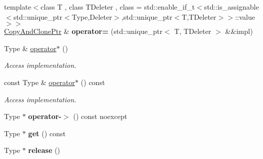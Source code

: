 \begin{DoxyCompactItemize}
\item 
\hypertarget{classSpacy_1_1CopyAndClonePtr_a98faf33ac3e6eb4c2de4b2079499e8cd}{}{\footnotesize template$<$class T , class T\+Deleter , class  = std\+::enable\+\_\+if\+\_\+t$<$std\+::is\+\_\+assignable$<$std\+::unique\+\_\+ptr$<$\+Type,\+Deleter$>$,std\+::unique\+\_\+ptr$<$\+T,\+T\+Deleter$>$$>$\+::value$>$$>$ }\\\hyperlink{classSpacy_1_1CopyAndClonePtr}{Copy\+And\+Clone\+Ptr} \& {\bfseries operator=} (std\+::unique\+\_\+ptr$<$ T, T\+Deleter $>$ \&\&impl)\label{classSpacy_1_1CopyAndClonePtr_a98faf33ac3e6eb4c2de4b2079499e8cd}

\item 
\hypertarget{classSpacy_1_1CopyAndClonePtr_a911630a71d1f0ea794ce1f949f3623b6}{}Type \& \hyperlink{classSpacy_1_1CopyAndClonePtr_a911630a71d1f0ea794ce1f949f3623b6}{operator$\ast$} ()\label{classSpacy_1_1CopyAndClonePtr_a911630a71d1f0ea794ce1f949f3623b6}

\begin{DoxyCompactList}\small\item\em Access implementation. \end{DoxyCompactList}\item 
\hypertarget{classSpacy_1_1CopyAndClonePtr_a9b9698a6f5ab30161ac02ddca237e73c}{}const Type \& \hyperlink{classSpacy_1_1CopyAndClonePtr_a9b9698a6f5ab30161ac02ddca237e73c}{operator$\ast$} () const \label{classSpacy_1_1CopyAndClonePtr_a9b9698a6f5ab30161ac02ddca237e73c}

\begin{DoxyCompactList}\small\item\em Access implementation. \end{DoxyCompactList}\item 
\hypertarget{classSpacy_1_1CopyAndClonePtr_a4fd7e899ea890451f262f46a7cd1fdb2}{}Type $\ast$ {\bfseries operator-\/$>$} () const noexcept\label{classSpacy_1_1CopyAndClonePtr_a4fd7e899ea890451f262f46a7cd1fdb2}

\item 
\hypertarget{classSpacy_1_1CopyAndClonePtr_a52fa929c6f09c32e3f34be0839dc6ba7}{}Type $\ast$ {\bfseries get} () const \label{classSpacy_1_1CopyAndClonePtr_a52fa929c6f09c32e3f34be0839dc6ba7}

\item 
\hypertarget{classSpacy_1_1CopyAndClonePtr_a1fa01ba6b5b409fe98a06bfbff6f3745}{}Type $\ast$ {\bfseries release} ()\label{classSpacy_1_1CopyAndClonePtr_a1fa01ba6b5b409fe98a06bfbff6f3745}


\end{DoxyCompactItemize}
